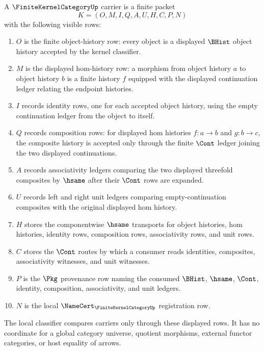\begin{definition}
\label{def:finite-kernel-category-carrier}
A $\FiniteKernelCategoryUp$ carrier is a finite packet
$$
K=(O,M,I,Q,A,U,H,C,P,N)
$$
with the following visible rows:
\begin{enumerate}
\item $O$ is the finite object-history row: every object is a displayed $\BHist$ object history accepted by the kernel classifier.
\item $M$ is the displayed hom-history row: a morphism from object history $a$ to object history $b$ is a finite history $f$ equipped with the displayed continuation ledger relating the endpoint histories.
\item $I$ records identity rows, one for each accepted object history, using the empty continuation ledger from the object to itself.
\item $Q$ records composition rows: for displayed hom histories $f:a\to b$ and $g:b\to c$, the composite history is accepted only through the finite $\Cont$ ledger joining the two displayed continuations.
\item $A$ records associativity ledgers comparing the two displayed threefold composites by $\hsame$ after their $\Cont$ rows are expanded.
\item $U$ records left and right unit ledgers comparing empty-continuation composites with the original displayed hom history.
\item $H$ stores the componentwise $\hsame$ transports for object histories, hom histories, identity rows, composition rows, associativity rows, and unit rows.
\item $C$ stores the $\Cont$ routes by which a consumer reads identities, composites, associativity witnesses, and unit witnesses.
\item $P$ is the $\Pkg$ provenance row naming the consumed $\BHist$, $\hsame$, $\Cont$, identity, composition, associativity, and unit ledgers.
\item $N$ is the local $\NameCert_{\FiniteKernelCategoryUp}$ registration row.
\end{enumerate}
The local classifier compares carriers only through these displayed rows. It has no coordinate for a global category universe, quotient morphisms, external functor categories, or host equality of arrows.
\end{definition}

